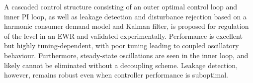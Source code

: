 A cascaded control structure consisting of an outer optimal control loop and inner PI loop, as well as leakage detection and disturbance rejection based on a harmonic consumer demand model and Kalman filter, is proposed for regulation of the level in an EWR and validated experimentally. Performance is excellent but highly tuning-dependent, with poor tuning leading to coupled oscillatory behaviour. Furthermore, steady-state oscillations are seen in the inner loop, and likely cannot be eliminated without a decoupling scheme. Leakage detection, however, remains robust even when controller performance is suboptimal.